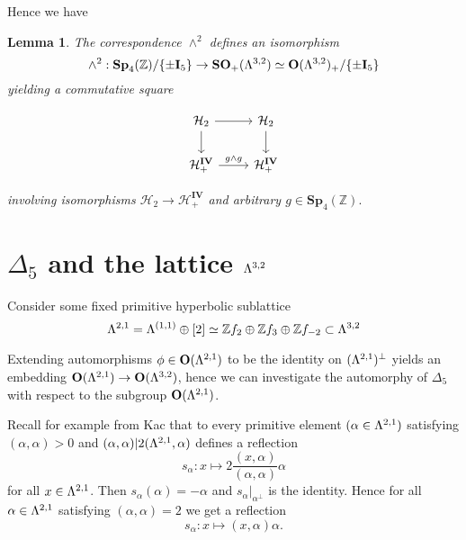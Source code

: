\documentclass[9pt]{amsart} \usepackage[utf8]{inputenc}
\newtheorem{lemma}{Lemma}
\newcommand{\Z}{\mathbb{Z}} \newcommand{\C}{\mathbb{C}}
\newcommand{\HypPlan}{\Lambda^{(1,1)}}
\newcommand{\Sp}{\mathbf{Sp}}
\newcommand{\Orth}{\mathbf{O}}
\newcommand{\SO}{\mathbf{SO}}
\newcommand{\Hpl}{\mathcal{H}}
\newcommand{\IV}{\mathbf{IV}}
\newcommand{\Id}{\mathbf{I}}
\begin{document}
Hence we have

\begin{lemma}
The correspondence $\wedge^2$ defines an isomorphism $$\wedge^2 :
\Sp_4(\Z)/\{\pm \Id_5\} \rightarrow \SO_+(\La^{3,2}) \simeq
\Orth(\La^{3,2})_+/\{\pm\Id_5\}$$ yielding a commutative square

  \[ \begin{tikzcd}
\Hpl_2 \arrow{r}{} \arrow[swap]{d}{} & \Hpl_2 \arrow{d}{} \\%
\Hpl_+^{\IV} \arrow{r}{g \wedge g}& \Hpl_+^{\IV}
\end{tikzcd}
\]


involving isomorphisms $\Hpl_2 \rightarrow \Hpl_+^{\IV}$ and arbitrary
$g \in \Sp_4(\Z).$

\end{lemma}

\section{$\Delta_5$ and the lattice $\Lambda^{3,2}$}

Consider some fixed primitive hyperbolic sublattice
$$\La^{2,1} = \HypPlan \oplus [2] \simeq \Z f_2 \oplus \Z f_3 \oplus \Z
f_{-2} \subset \La^{3,2}$$

Extending automorphisms $\phi \in \Orth(\La^{2,1})$ to be the identity
on $(\Lambda^{2,1})^{\perp}$ yields an embedding $\Orth(\La^{2,1})
\rightarrow \Orth(\La^{3,2})$, hence we can investigate the automorphy
of $\Delta_5$ with respect to the subgroup $\Orth(\La^{2,1})$.


Recall for example from Kac \cite{KAC:1} that to every primitive element $(\alpha \in
\Lambda^{2,1})$ satisfying $(\alpha,\alpha) > 0$ and $(\alpha, \alpha) |
2(\Lambda^{2,1}, \alpha)$ defines a reflection $$s_{\alpha}: x \mapsto
2\frac{(x,\alpha)}{(\alpha, \alpha)}\alpha$$ for all $x \in \Lambda^{2,1}$. Then
$s_{\alpha}(\alpha) = -\alpha$ and $s_{\alpha}|_{\alpha^{\perp}}$ is the
identity. Hence for all $\alpha \in \Lambda^{2,1}$ satisfying
$(\alpha,\alpha) = 2$ we get a reflection $$s_{\alpha}: x \mapsto
(x,\alpha)\alpha.$$
\end{document}
